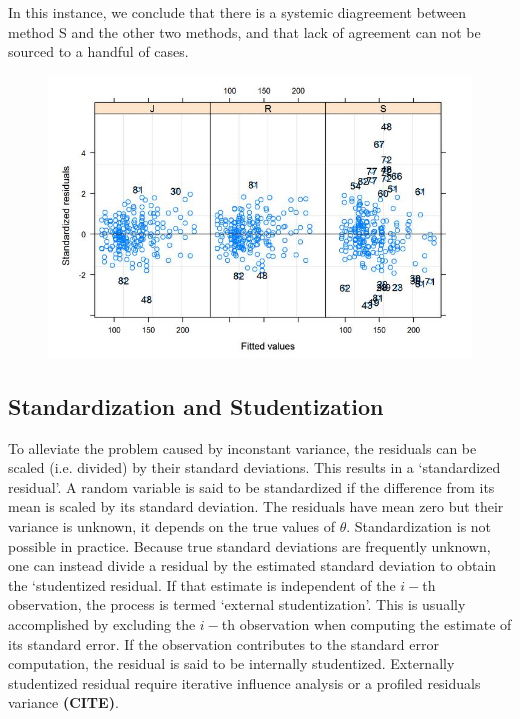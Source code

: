 \documentclass[12pt, a4paper]{report}
\theoremstyle{plain}
\theoremstyle{definition}
\theoremstyle{remark}
\begin{document}
	In this instance, we conclude that there is a systemic diagreement between method S and the other two methods, and that lack of agreement can not be sourced to a handful of cases.
	\begin{figure}[h!]
		\centering
		\includegraphics[width=0.7\linewidth]{images/bloodnlmeResidPlot2B}
	\end{figure}
	 
	 \newpage
	
	
		
	

	\subsection{Standardization and Studentization} %
	To alleviate the problem caused by inconstant variance, the residuals can be scaled (i.e. divided) by their standard deviations. This results in a `standardized residual'. A random variable is said to be standardized if the difference from its mean is scaled by its standard deviation. The residuals  have mean zero but their variance is unknown, it depends on the true values of $\theta$. Standardization is  not possible in practice. Because true standard deviations are frequently unknown, one can instead divide a residual by the estimated standard deviation to obtain the `studentized residual. 
	If that estimate is independent of the $i-$th observation, the process is termed `external studentization'. This is usually accomplished by excluding the $i-$th observation when computing the estimate of its standard error. If the observation contributes to the
	standard error computation, the residual is said to be internally studentized.
	Externally  studentized residual require iterative influence analysis or a profiled residuals variance \textbf{(CITE)}.
	
\end{document}
